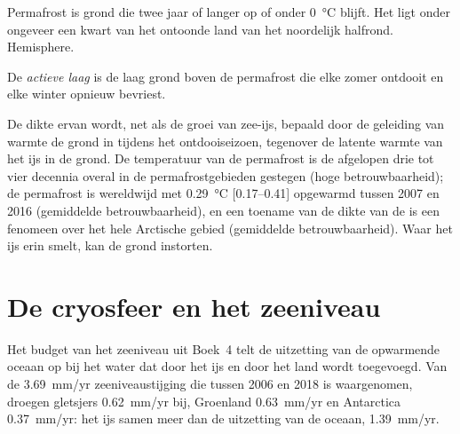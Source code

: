 Permafrost is grond die twee jaar of langer op of onder \qty{0}{\celsius} blijft.
Het ligt onder ongeveer een kwart van het ontoonde land van het noordelijk halfrond.
Hemisphere.

\begin{definition}\label{def:b3:glaciology:permafrost}
De \emph{actieve laag} is de laag grond boven de permafrost die
elke zomer ontdooit en elke winter opnieuw bevriest.
\end{definition}

De dikte ervan wordt, net als de groei van zee-ijs, bepaald door de geleiding van
warmte de grond in tijdens het ontdooiseizoen, tegenover de latente warmte van het
ijs in de grond. De temperatuur van de permafrost is de afgelopen drie tot vier
decennia overal in de permafrostgebieden gestegen (hoge betrouwbaarheid);
de permafrost is wereldwijd met \qty{0.29}{\celsius} [\numrange{0.17}{0.41}]
opgewarmd tussen 2007 en 2016 (gemiddelde betrouwbaarheid), en een toename van de
dikte van de  is een fenomeen over het hele Arctische gebied (gemiddelde betrouwbaarheid).
Waar het ijs erin smelt, kan de grond instorten.

\section{De cryosfeer en het zeeniveau}\label{sec:b3:glaciology:sea-level}

Het budget van het zeeniveau uit Boek~4 telt de uitzetting van de opwarmende
oceaan op bij het water dat door het ijs en door het land wordt toegevoegd. Van de
\qty{3.69}{mm/yr} zeeniveaustijging die tussen 2006 en 2018 is waargenomen, droegen
gletsjers \qty{0.62}{mm/yr} bij, Groenland \qty{0.63}{mm/yr} en Antarctica
\qty{0.37}{mm/yr}: het ijs samen meer dan de uitzetting van de oceaan,
\qty{1.39}{mm/yr}.

